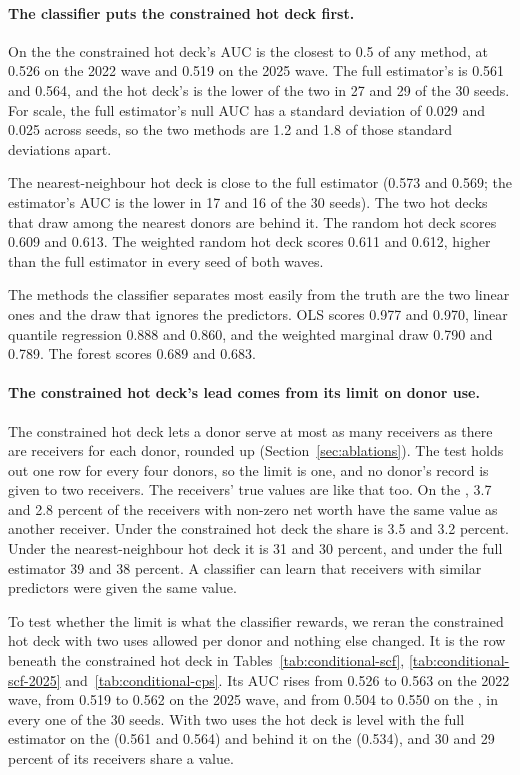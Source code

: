 \paragraph{The classifier puts the constrained hot deck first.} On the
\scf{} the constrained hot deck's AUC is the closest to 0.5 of any method,
at 0.526 on the 2022 wave and 0.519 on the 2025 wave. The full estimator's is
0.561 and 0.564, and the hot deck's is the lower of the two in 27 and 29 of
the 30 seeds. For scale, the full estimator's null AUC has a standard
deviation of 0.029 and 0.025 across seeds, so the two methods are 1.2 and
1.8 of those standard deviations apart.

The nearest-neighbour hot deck is close to the full estimator (0.573 and
0.569; the estimator's AUC is the lower in 17 and 16 of the 30 seeds). The
two hot decks that draw among the nearest donors are behind it. The random
hot deck scores 0.609 and 0.613. The weighted random hot deck scores 0.611
and 0.612, higher than the full estimator in every seed of both waves.

The methods the classifier separates most easily from the truth are the two
linear ones and the draw that ignores the predictors. OLS scores 0.977 and
0.970, linear quantile regression 0.888 and 0.860, and the weighted marginal
draw 0.790 and 0.789. The \microimpute{} forest scores 0.689 and 0.683.

\paragraph{The constrained hot deck's lead comes from its limit on donor
use.} The constrained hot deck lets a donor serve at most as many receivers
as there are receivers for each donor, rounded up
(Section~\ref{sec:ablations}). The test holds out one row for every four
donors, so the limit is one, and no donor's record is given to two
receivers. The receivers' true values are like that too. On the \scf{}, 3.7
and 2.8 percent of the receivers with non-zero net worth have the same value
as another receiver. Under the constrained hot deck the share is 3.5 and 3.2
percent. Under the nearest-neighbour hot deck it is 31 and 30 percent, and
under the full estimator 39 and 38 percent. A classifier can learn that
receivers with similar predictors were given the same value.

To test whether the limit is what the classifier rewards, we reran the
constrained hot deck with two uses allowed per donor and nothing else
changed. It is the row beneath the constrained hot deck in
Tables~\ref{tab:conditional-scf}, \ref{tab:conditional-scf-2025}
and~\ref{tab:conditional-cps}. Its AUC rises from 0.526 to 0.563 on the 2022
wave, from 0.519 to 0.562 on the 2025 wave, and from 0.504 to 0.550 on the
\cps{}, in every one of the 30 seeds. With two uses the hot deck is level
with the full estimator on the \scf{} (0.561 and 0.564) and behind it on the
\cps{} (0.534), and 30 and 29 percent of its receivers share a value.

